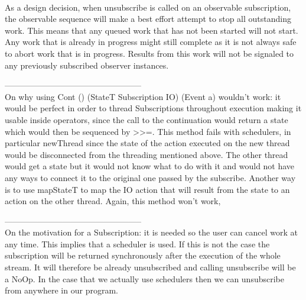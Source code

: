 

\\


As a design decision, when unsubscribe is called on an observable subscription, the observable sequence will make a best effort attempt to stop all outstanding work. This means that any queued work that has not been started will not start. Any work that is already in progress might still complete as it is not always safe to abort work that is in progress. Results from this work will not be signaled to any previously subscribed observer instances.


--------------------------------------------------\\
On why using Cont () (StateT Subscription IO) (Event a) wouldn't work: it would be perfect in order to thread Subscriptions throughout execution making it usable inside operators, since the call to the continuation would return a state which would then be sequenced by >>=. This method fails with schedulers, in particular newThread since the state of the action executed on the new thread would be disconnected from the threading mentioned above. The other thread would get a state but it would not know what to do with it and would not have any ways to connect it to the original one passed by the subscribe. Another way is to use mapStateT to map the IO action that will result from the state to an action on the other thread. Again, this method won't work, 

--------------------------------------------------\\
On the motivation for a Subscription: it is needed so the user can cancel work at any time. This implies that a scheduler is used. If this is not the case the subscription will be returned synchronously after the execution of the whole stream. It will therefore be already unsubscribed and calling unsubscribe will be a NoOp. In the case that we actually use schedulers then we can unsubscribe from anywhere in our program. 

